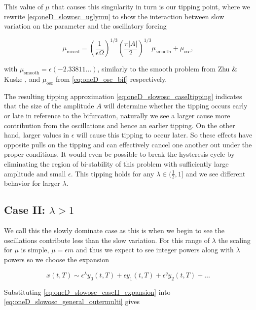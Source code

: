 This value of $\mu$ that causes this singularity in turn is our tipping point, where we rewrite \eqref{eq:oneD_slowosc_uglymu} to show the interaction between slow variation on the parameter and the oscillatory forcing

\begin{equation}\label{eq:oneD_slowosc_caseItipping}
\mu_{\text{mixed}} = \left(\frac{1}{\epsilon\Omega}\right)^{1/3}\left(\frac{\pi |A|}{2}\right)^{1/3} \mu_{\text{smooth}}+\mu_{\text{osc}},
\end{equation}

with $\mu_{\text{smooth}}=\epsilon\left(-2.33811\ldots\right)$, similarly to the smooth problem from Zhu \& Kuske \cite{zhu2015tipping}, and $\mu_{\text{osc}}$ from \eqref{eq:oneD_osc_bif} respectively.

The resulting tipping approximation \eqref{eq:oneD_slowosc_caseItipping} indicates that the size of the amplitude $A$ will determine whether the tipping occurs early or late in reference to the bifurcation, naturally we see a larger cause more contribution from the oscillations and hence an earlier tipping. On the other hand, larger values in $\epsilon$ will cause this tipping to occur later. So these effects have opposite pulls on the tipping and can effectively cancel one another out under the proper conditions. It would even be possible to break the hysteresis cycle by eliminating the region of bi-stability of this problem with sufficiently large amplitude and small $\epsilon$. This tipping holds for any $\lambda\in (\frac{1}{2},1]$ and we see different behavior for larger $\lambda$.

\subsection{Case II: $\lambda>1$}
\label{subsec:oneD_slowosc_caseII}

We call this the slowly dominate case as this is when we begin to see the oscillations contribute less than the slow variation. For this range of $\lambda$ the scaling for $\mu$ is simple, $\mu=\epsilon m$ and thus we expect to see integer powers along with $\lambda$ powers so we choose the expansion

\begin{equation}\label{eq:oneD_slowosc_caseII_expansion}
x(t,T) \sim \epsilon^\lambda y_0(t,T)+\epsilon y_1(t,T)+\epsilon^q y_2(t,T)+\ldots
\end{equation}


Substituting \eqref{eq:oneD_slowosc_caseII_expansion} into \eqref{eq:oneD_slowosc_general_outermulti} gives

